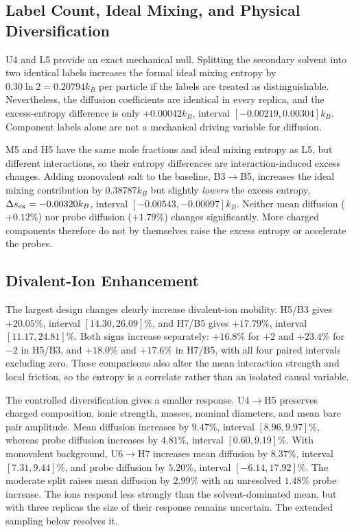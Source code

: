 \documentclass[aps,pre,twocolumn,superscriptaddress,floatfix]{revtex4-2}
\begin{document}
\subsection{Label Count, Ideal Mixing, and Physical Diversification}

U4 and L5 provide an exact mechanical null. Splitting the secondary solvent into two identical labels increases the formal ideal mixing entropy by $0.30\ln2=0.20794k_B$ per particle if the labels are treated as distinguishable. Nevertheless, the diffusion coefficients are identical in every replica, and the excess-entropy difference is only $+0.00042k_B$, interval $[-0.00219,0.00304]k_B$. Component labels alone are not a mechanical driving variable for diffusion.

M5 and H5 have the same mole fractions and ideal mixing entropy as L5, but different interactions, so their entropy differences are interaction-induced excess changes. Adding monovalent salt to the baseline, B3$\to$B5, increases the ideal mixing contribution by $0.38787k_B$ but slightly \emph{lowers} the excess entropy, $\Delta s_{\rm ex}=-0.00320k_B$, interval $[-0.00543,-0.00097]k_B$. Neither mean diffusion ($+0.12\%$) nor probe diffusion ($+1.79\%$) changes significantly. More charged components therefore do not by themselves raise the excess entropy or accelerate the probes.

\subsection{Divalent-Ion Enhancement}

The largest design changes clearly increase divalent-ion mobility. H5/B3 gives $+20.05\%$, interval $[14.30,26.09]\%$, and H7/B5 gives $+17.79\%$, interval $[11.17,24.81]\%$. Both signs increase separately: $+16.8\%$ for $+2$ and $+23.4\%$ for $-2$ in H5/B3, and $+18.0\%$ and $+17.6\%$ in H7/B5, with all four paired intervals excluding zero. These comparisons also alter the mean interaction strength and local friction, so the entropy is a correlate rather than an isolated causal variable.

The controlled diversification gives a smaller response. U4$\to$H5 preserves charged composition, ionic strength, masses, nominal diameters, and mean bare pair amplitude. Mean diffusion increases by $9.47\%$, interval $[8.96,9.97]\%$, whereas probe diffusion increases by $4.81\%$, interval $[0.60,9.19]\%$. With monovalent background, U6$\to$H7 increases mean diffusion by $8.37\%$, interval $[7.31,9.44]\%$, and probe diffusion by $5.20\%$, interval $[-6.14,17.92]\%$. The moderate split raises mean diffusion by $2.99\%$ with an unresolved $1.48\%$ probe increase. The ions respond less strongly than the solvent-dominated mean, but with three replicas the size of their response remains uncertain. The extended sampling below resolves it.
\end{document}
